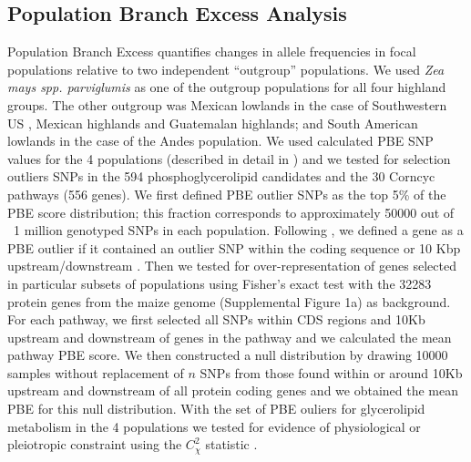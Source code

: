 \documentclass[9pt,twocolumn,twoside,lineno]{BioRxiv}
\begin{document}
\subsection{Population Branch Excess Analysis}
Population Branch Excess quantifies changes in allele frequencies in focal populations relative to two independent “outgroup” populations.
We used \textit{Zea mays spp. parviglumis} as one of the outgroup populations for all four highland groups.  
The other outgroup was  Mexican lowlands  in the case of Southwestern US , Mexican highlands and Guatemalan highlands; and South American lowlands in the case of the Andes population. 
We used calculated PBE SNP values for the 4 populations (described in detail in \cite{Wang2020-mp}) and we tested for selection outliers SNPs in the 594 phosphoglycerolipid candidates and the 30 Corncyc pathways (556 genes).
We first defined PBE outlier SNPs as the top 5\% of the PBE score distribution; this fraction corresponds to approximately 50000 out of ~1 million genotyped SNPs in each population. 
Following \citet{Wang2020-mp}, we defined a gene as a PBE outlier if it contained an outlier SNP within the coding sequence or 10 Kbp upstream/downstream  . 
Then we tested for over-representation of genes selected in particular subsets of populations using Fisher's exact test with the 32283 protein genes from the maize genome (Supplemental Figure 1a) \cite{wang2015a} as background. 
For each pathway, we first selected all SNPs within CDS regions and 10Kb upstream and downstream of genes in the pathway and we calculated the mean pathway PBE score. 
We then constructed a null distribution by drawing 10000 samples without replacement of $n$ SNPs from those found within or around 10Kb upstream and downstream of all protein coding genes and we obtained the mean PBE for this null distribution. 
With the set of PBE ouliers for glycerolipid metabolism in the 4 populations we tested for evidence of physiological or pleiotropic constraint using the $C_\chi^2$ statistic \cite{yeaman2018}. 
\end{document}
